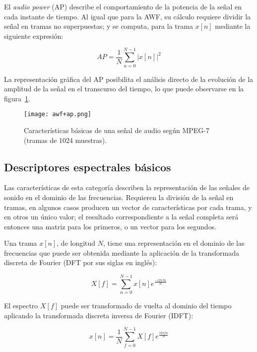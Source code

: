 El \textit{audio power} (AP) describe el comportamiento de la potencia de la señal en cada instante de tiempo.
Al igual que para la AWF, su cálculo requiere dividir la señal en tramas no superpuestas;
y se computa, para la trama $x[n]$ mediante la siguiente expresión:

\begin{equation}
    \label{eq:AP}
    AP = \frac{1}{N}\sum_{n=0}^{N-1}{|x[n]|^2}
\end{equation}

La representación gráfica del AP posibilita el análisis directo de la evolución de la amplitud de la señal en el transcurso del tiempo, lo que puede observarse en la figura~\ref{img:awf+ap}.

\begin{figure}[!h]
    \centering
    \texttt{[image: awf+ap.png]}
    \caption{Características básicas de una señal de audio según MPEG-7 (tramas de 1024 muestras).}
    \label{img:awf+ap}
\end{figure}

\subsection{Descriptores espectrales básicos}\label{subsec:descriptoresEspectralesBásicos}

Las características de esta categoría describen la representación de las señales de sonido en el dominio de las frecuencias.
Requieren la división de la señal en tramas, en algunos casos producen un vector de características por cada trama, y en otros un único valor;
el resultado correspondiente a la señal completa será entonces una matriz para los primeros, o un vector para los segundos.

Una trama $x[n]$, de longitud $N$, tiene una representación en el dominio de las frecuencias que puede ser obtenida mediante la aplicación de la transformada discreta de Fourier (DFT por sus siglas en inglés):

\begin{equation}
    \label{eq:DFT}
    X[f] = \sum_{n=0}^{N-1}{x[n]e^{\frac{-i2\pi fn}{N}}}
\end{equation}

El espectro $X[f]$ puede ser transformado de vuelta al dominio del tiempo aplicando la transformada discreta inversa de Fourier (IDFT):

\begin{equation}
    \label{eq:IDFT}
    x[n] = \frac{1}{N}\sum_{f=0}^{N-1}{X[f]e^{\frac{i2\pi fn}{N}}}
\end{equation}

